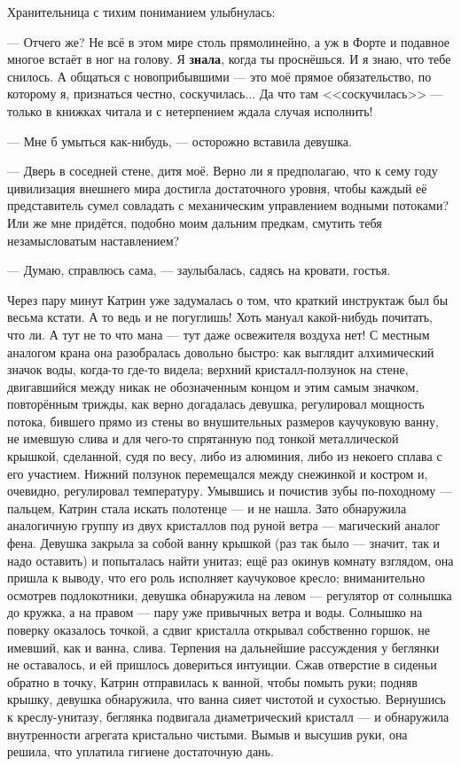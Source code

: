 Хранительница с тихим пониманием улыбнулась:

--- Отчего же? Не всё в этом мире столь прямолинейно, а уж в Форте и подавное многое встаёт в ног на голову.
Я \textbf{знала}, когда ты проснёшься. И я знаю, что тебе снилось.
А общаться с новоприбывшими --- это моё прямое обязательство, по которому я, признаться честно, соскучилась...
Да что там <<соскучилась>> --- только в книжках читала и с нетерпением ждала случая исполнить!

--- Мне б умыться как-нибудь, --- осторожно вставила девушка.

--- Дверь в соседней стене, дитя моё. Верно ли я предполагаю,
что к сему году цивилизация внешнего мира достигла достаточного уровня,
чтобы каждый её представитель сумел совладать с механическим управлением водными потоками?
Или же мне придётся, подобно моим дальним предкам, смутить тебя незамысловатым наставлением?

--- Думаю, справлюсь сама, --- заулыбалась, садясь на кровати, гостья.

\emptypar

Через пару минут Катрин уже задумалась о том, что краткий инструктаж был бы весьма кстати. А то ведь и не погуглишь!
Хоть мануал какой-нибудь почитать, что ли. А тут не то что мана --- тут даже освежителя воздуха нет!
С местным аналогом крана она разобралась довольно быстро: как выглядит алхимический значок воды, когда-то где-то видела;
верхний кристалл-ползунок на стене, двигавшийся между никак не обозначенным концом и этим самым значком, повторённым трижды,
как верно догадалась девушка, регулировал мощность потока, бившего прямо из стены во внушительных размеров каучуковую ванну,
не имевшую слива и для чего-то спрятанную под тонкой металлической крышкой, сделанной, судя по весу, либо из алюминия,
либо из некоего сплава с его участием.
Нижний ползунок перемещался между снежинкой и костром и, очевидно, регулировал температуру.
Умывшись и почистив зубы по-походному --- пальцем, Катрин стала искать полотенце --- и не нашла.
Зато обнаружила аналогичную группу из двух кристаллов под руной ветра --- магический аналог фена.
Девушка закрыла за собой ванну крышкой (раз так было --- значит, так и надо оставить) и попыталась найти унитаз;
ещё раз окинув комнату взглядом, она пришла к выводу, что его роль исполняет каучуковое кресло;
вниманительно осмотрев подлокотники, девушка обнаружила на левом --- регулятор от солнышка до кружка,
а на правом --- пару уже привычных ветра и воды.
Солнышко на поверку оказалось точкой, а сдвиг кристалла открывал собственно горшок, не имевший, как и ванна, слива.
Терпения на дальнейшие рассуждения у беглянки не оставалось, и ей пришлось довериться интуиции.
Сжав отверстие в сиденьи обратно в точку, Катрин отправилась к ванной, чтобы помыть руки;
подняв крышку, девушка обнаружила, что ванна сияет чистотой и сухостью.
Вернушись к креслу-унитазу, беглянка подвигала диаметрический кристалл --- и обнаружила внутренности агрегата кристально чистыми.
Вымыв и высушив руки, она решила, что уплатила гигиене достаточную дань.

